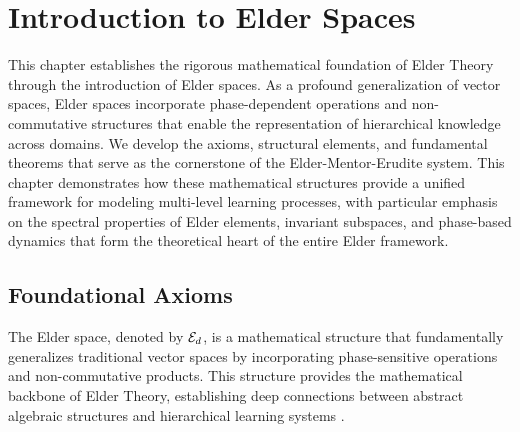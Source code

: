 \chapter{Introduction to Elder Spaces}

\begin{chapterabstract}
This chapter establishes the rigorous mathematical foundation of Elder Theory through the introduction of Elder spaces. As a profound generalization of vector spaces, Elder spaces incorporate phase-dependent operations and non-commutative structures that enable the representation of hierarchical knowledge across domains. We develop the axioms, structural elements, and fundamental theorems that serve as the cornerstone of the Elder-Mentor-Erudite system. This chapter demonstrates how these mathematical structures provide a unified framework for modeling multi-level learning processes, with particular emphasis on the spectral properties of Elder elements, invariant subspaces, and phase-based dynamics that form the theoretical heart of the entire Elder framework.
\end{chapterabstract}

\section{Foundational Axioms}

The Elder space, denoted by $\mathcal{E}_{d}$, is a mathematical structure that fundamentally generalizes traditional vector spaces by incorporating phase-sensitive operations and non-commutative products. This structure provides the mathematical backbone of Elder Theory, establishing deep connections between abstract algebraic structures and hierarchical learning systems \cite{elder_theory}.

